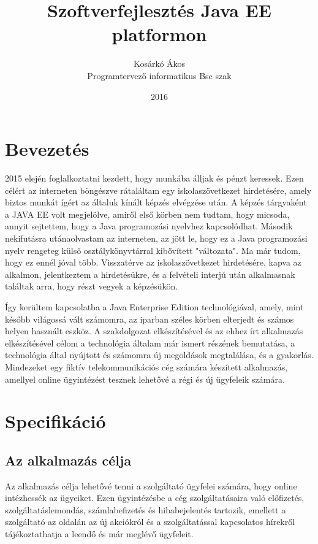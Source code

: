 \documentclass[centeredchapter]{thesis-ekf}
\institute{Matematikai és Informatikai Intézet}
\title{Szoftverfejlesztés Java EE platformon}
\author{Kosárkó Ákos \\ Programtervező informatikus Bsc szak}
\date{2016}
\theoremstyle{definition}
\theoremstyle{remark}
\begin{document}
\maketitle
\tableofcontents


\chapter*{Bevezetés}

2015 elején foglalkoztatni kezdett, hogy munkába álljak és pénzt keressek. Ezen célért az interneten böngészve rátaláltam egy iskolaszövetkezet hirdetésére, amely biztos munkát ígért az általuk kínált képzés elvégzése után. A képzés tárgyaként a JAVA EE volt megjelölve, amiről első körben nem tudtam, hogy micsoda, annyit sejtettem, hogy a Java programozási nyelvhez kapcsolódhat. Második nekifutásra utánaolvastam az interneten, az jött le, hogy ez a Java programozási nyelv rengeteg külső osztálykönyvtárral kibővített "változata". Ma már tudom, hogy ez ennél jóval több. Visszatérve az iskolaszövetkezet hirdetésére, kapva az alkalmon, jelentkeztem a hirdetésükre, és a felvételi interjú után alkalmasnak találtak arra, hogy részt vegyek a képzésükön. 

Így kerültem kapcsolatba a Java Enterprise Edition technológiával, amely, mint később világossá vált számomra, az iparban széles körben elterjedt és számos helyen használt eszköz. A szakdolgozat elkészítésével és az ehhez írt alkalmazás elkészítésével célom a technológia általam már ismert részének bemutatása, a technológia által nyújtott és számomra új megoldások megtalálása, és a gyakorlás. Mindezeket egy fiktív telekommunikációs cég számára készített alkalmazás, amellyel online ügyintézést tesznek lehetővé a régi és új ügyfeleik számára.

\chapter{Specifikáció}

\section{Az alkalmazás célja}

Az alkalmazás célja lehetővé tenni a szolgáltató ügyfelei számára, hogy online intézhessék az ügyeiket. Ezen ügyintézésbe a cég szolgáltatásaira való előfizetés, szolgáltatáslemondás, számlabefizetés és hibabejelentés tartozik, emellett a szolgáltató az oldalán az új akciókról és a szolgáltatással kapcsolatos hírekről tájékoztathatja a leendő és már meglévő ügyfeleit. 
\end{document}
